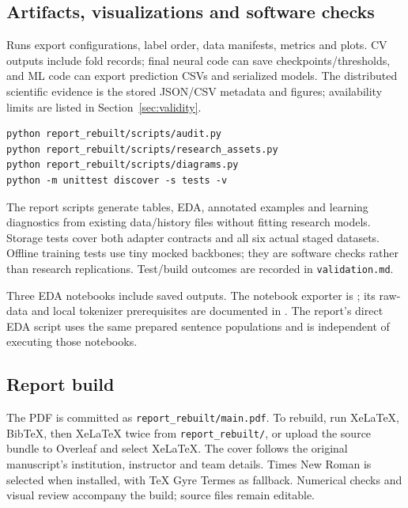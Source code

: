 \subsection{Artifacts, visualizations and software checks}
Runs export configurations, label order, data manifests, metrics and plots. CV outputs include fold records; final neural code can save checkpoints/thresholds, and ML code can export prediction CSVs and serialized models. The distributed scientific evidence is the stored JSON/CSV metadata and figures; availability limits are listed in Section~\ref{sec:validity}.
\begin{lstlisting}
python report_rebuilt/scripts/audit.py
python report_rebuilt/scripts/research_assets.py
python report_rebuilt/scripts/diagrams.py
python -m unittest discover -s tests -v
\end{lstlisting}
The report scripts generate tables, EDA, annotated examples and learning diagnostics from existing data/history files without fitting research models. Storage tests cover both adapter contracts and all six actual staged datasets. Offline training tests use tiny mocked backbones; they are software checks rather than research replications. Test/build outcomes are recorded in \texttt{validation.md}.

Three EDA notebooks include saved outputs. The notebook exporter is ; its raw-data and local tokenizer prerequisites are documented in . The report's direct EDA script uses the same prepared sentence populations and is independent of executing those notebooks.

\subsection{Report build}
The PDF is committed as \texttt{report\_rebuilt/main.pdf}. To rebuild, run XeLaTeX, BibTeX, then XeLaTeX twice from \texttt{report\_rebuilt/}, or upload the source bundle to Overleaf and select XeLaTeX. The cover follows the original manuscript's institution, instructor and team details. Times New Roman is selected when installed, with TeX Gyre Termes as fallback. Numerical checks and visual review accompany the build; source files remain editable.
